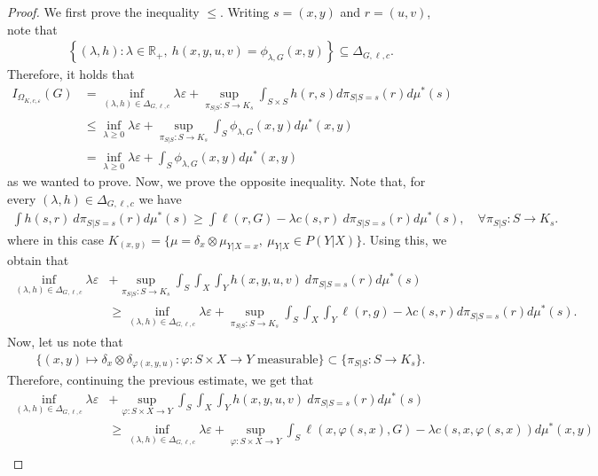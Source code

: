 \documentclass{article}
\newcommand{\R}{\mathbb{R}} %
\newcommand{\Okc}{\Omega_{K, c, \varepsilon}}
\newcommand{\D}{\Delta_{G,\ell, c}}
\newcommand{\phifix}{\phi_{\lambda, G}}
\theoremstyle{definition}
\theoremstyle{remarksty}
\begin{document}
\begin{proof}
We first prove the inequality $\leq$. Writing $s=(x,y)$ and $r=(u,v)$, note that 
 \begin{align*}
        \left\{(\lambda, h): \lambda \in \R_+,\ h(x,y,u,v) = \phifix(x,y) \right\} \subseteq \D.
    \end{align*}
Therefore, it holds that 
\begin{align*}
    I_{\Okc} (G) & = \inf_{(\lambda, h) \in \D} \lambda \varepsilon + \sup_{\pi_{S|S} : S \rightarrow K_s} \int_{S \times S} h(r,s) d\pi_{S|S=s} (r) d\mu^*(s)\\
    & \leq \inf_{\lambda \geq 0} \lambda\varepsilon + \sup_{\pi_{S|S} : S \rightarrow K_s} \int_S \phifix(x,y) d\mu^*(x,y) \\
    & = \inf_{\lambda \geq 0} \lambda\varepsilon+ \int_S \phifix(x,y) d\mu^*(x,y)
\end{align*}
as we wanted to prove. Now, we prove the opposite inequality.
    Note that, for every $(\lambda, h) \in \D$ we have
    \begin{align*}
        \int h(s,r) \ d\pi_{S|S=s} (r) d\mu^*(s) \geq \int \ell(r,G) - \lambda c(s,r) \ d\pi_{S|S=s} (r) d\mu^*(s),\quad \forall \pi_{S|S}: S \rightarrow K_s.
    \end{align*}
     where in this case $K_{(x,y)}=\{\mu=\delta_x \otimes \mu_{Y|X=x},\ \mu_{Y|X} \in P(Y|X) \}$.
     Using this, we obtain that 
    \begin{align*}
        \inf_{(\lambda, h) \in \D} \lambda \varepsilon &+ \sup_{\pi_{S|S} : S \rightarrow K_s} \int_S \int_X \int_Y h(x,y,u,v)\ d\pi_{S|S=s} (r) d\mu^*(s) \\
        &\geq \inf_{(\lambda, h) \in \D} \lambda \varepsilon  + \sup_{\pi_{S|S} : S \rightarrow K_s}\int_S \int_X  \int_Y \ell(r,g) - \lambda c(s,r) d\pi_{S|S=s} (r) d\mu^*(s).
    \end{align*}
    Now, let us note that
    \begin{align*}
        \{(x,y) \mapsto \delta_x \otimes \delta_{\varphi(x,y,u)} : \varphi : S \times X \rightarrow Y \text{ measurable}\} \subset \{\pi_{S|S} : S \rightarrow K_s\}.
    \end{align*}
    Therefore, continuing the previous estimate, we get that 
     \begin{align*}
        \inf_{(\lambda, h) \in \D} \lambda \varepsilon &+ \sup_{\varphi:S \times X \rightarrow Y} \int_S \int_X \int_Y h(x,y,u,v)\ d\pi_{S|S=s} (r) d \mu^*(s) \\
        & \geq \inf_{(\lambda, h) \in \D} \lambda \varepsilon  + \sup_{\varphi :S \times X \rightarrow Y}\int_S  \ell(x,\varphi(s,x),G) - \lambda c(s,x,\varphi(s,x)) d \mu^*(x,y)\\

\end{align*}
\end{proof}
\end{document}
